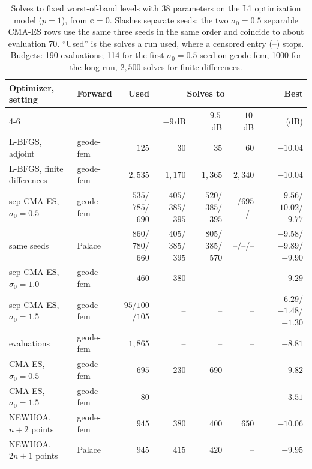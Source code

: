 \documentclass{anvil-paper}
\begin{document}
\begin{table}[t]
  \centering
  \caption{Solves to fixed worst-of-band levels with 38 parameters on the L1
  optimization model ($p = 1$), from $\mathbf{c} = 0$. Slashes separate
  seeds; the two $\sigma_0 = 0.5$ separable CMA-ES rows use the same three
  seeds in the same order and coincide to about evaluation 70. ``Used'' is
  the solves a run used, where a censored entry (--) stops. Budgets: 190
  evaluations; 114 for the first $\sigma_0 = 0.5$ seed on geode-fem, 1000
  for the long run, $2{,}500$ solves for finite differences.}
  \label{tab:baselines}
  \footnotesize
  \setlength{\tabcolsep}{3pt}
  \begin{tabular}{@{}l l r r r r r@{}}
    \toprule
    Optimizer, setting & Forward & Used & \multicolumn{3}{c}{Solves to} & Best \\
    \cmidrule(lr){4-6}
    & & & $-9$\,dB & $-9.5$\,dB & $-10$\,dB & (dB) \\
    \midrule
    L-BFGS, adjoint & geode-fem & $125$ & $30$ & $35$ & $60$ & $-10.04$ \\
    L-BFGS, finite differences & geode-fem & $2{,}535$ & $1{,}170$ & $1{,}365$ & $2{,}340$ & $-10.04$ \\
    \midrule
    sep-CMA-ES, $\sigma_0 = 0.5$ & geode-fem & $535$/$785$/$690$ & $405$/$385$/$395$ & $520$/$385$/$395$ & --/$695$/-- & $-9.56$/$-10.02$/$-9.77$ \\
    \quad same seeds & Palace & $860$/$780$/$660$ & $405$/$385$/$395$ & $805$/$385$/$570$ & --/--/-- & $-9.58$/$-9.89$/$-9.90$ \\
    sep-CMA-ES, $\sigma_0 = 1.0$ & geode-fem & $460$ & $380$ & -- & -- & $-9.29$ \\
    sep-CMA-ES, $\sigma_0 = 1.5$ & geode-fem & $95$/$100$/$105$ & -- & -- & -- & $-6.29$/$-1.48$/$-1.30$ \\
    \quad 1000 evaluations & geode-fem & $1{,}865$ & -- & -- & -- & $-8.81$ \\
    CMA-ES, $\sigma_0 = 0.5$ & geode-fem & $695$ & $230$ & $690$ & -- & $-9.82$ \\
    CMA-ES, $\sigma_0 = 1.5$ & geode-fem & $80$ & -- & -- & -- & $-3.51$ \\
    NEWUOA, $n + 2$ points & geode-fem & $945$ & $380$ & $400$ & $650$ & $-10.06$ \\
    NEWUOA, $2n + 1$ points & Palace & $945$ & $415$ & $420$ & -- & $-9.95$ \\
    \bottomrule
  \end{tabular}
\end{table}
\end{document}

